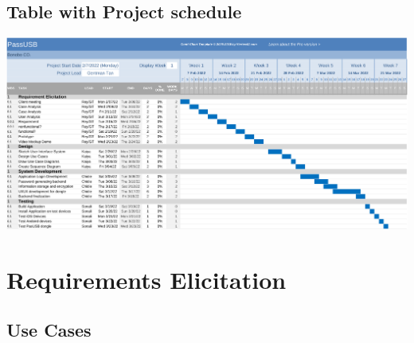 \documentclass[stu]{apa7}
\begin{document}
\subsection{Table with Project schedule}

\noindent \includegraphics[scale=0.65]{ganttchart.pdf}

\section{Requirements Elicitation}

\subsection{Use Cases}
\end{document}
